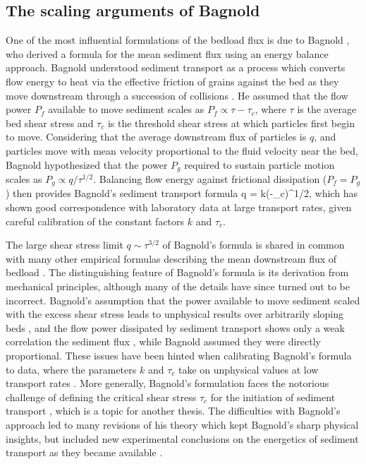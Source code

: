 \subsection{The scaling arguments of Bagnold}

One of the most influential formulations of the bedload flux is due to Bagnold \citep{Bagnold1956,Bagnold1966}, who derived a formula for the mean sediment flux using an energy balance approach.
Bagnold understood sediment transport as a process which converts flow energy to heat via the effective friction \citep{Bagnold1954} of grains against the bed as they move downstream through a succession of collisions \citep{Bagnold1973}.
He assumed that the flow power $P_f$ available to move sediment scales as $P_f \propto \tau - \tau_c$, where $\tau$ is the average bed shear stress and $\tau_c$ is the threshold shear stress at which particles first begin to move. 
Considering that the average downstream flux of particles is $q$, and particles move with mean velocity proportional to the fluid velocity near the bed, Bagnold hypothesized that the power $P_g$ required to sustain particle motion scales as $P_g \propto q/\tau^{1/2}.$
 Balancing flow energy against frictional dissipation ($P_f = P_g$) then provides Bagnold's sediment transport formula
\be q = k(\tau-\tau_c)\tau^{1/2}, \label{eq:bagnold}\ee
which has shown good correspondence with laboratory data at large transport rates, given careful calibration of the constant factors $k$ and $\tau_c$.

The large shear stress limit $q \sim \tau^{3/2}$ of Bagnold's formula is shared in common with many other empirical formulas describing the mean downstream flux of bedload \citep[e.g.][]{MeyerPeter1948, Yalin1972, Wilcock2003, Parker1998}. The distinguishing feature of Bagnold's formula is its derivation from mechanical principles, although many of the details have since turned out to be incorrect. Bagnold's assumption that the power available to move sediment scaled with the excess shear stress leads to unphysical results over arbitrarily sloping beds \citep{Seminara2002}, and the flow power dissipated by sediment transport shows only a weak correlation the sediment flux \citep{Ancey2008}, while Bagnold assumed they were directly proportional. These issues have been hinted when calibrating Bagnold's formula to data, where the parameters $k$ and $\tau_c$ take on unphysical values at low transport rates \citep{Nino1996}.
More generally, Bagnold's formulation faces the notorious challenge of defining the critical shear stress $\tau_c$ for the initiation of sediment transport \citep{Paintal1971,Kirchener1990,Houssais2015,Clark2017,Allen2018}, which is a topic for another thesis. 
The difficulties with Bagnold's approach led to many revisions of his theory which kept Bagnold's sharp physical insights, but included new experimental conclusions on the energetics of sediment transport as they became available \citep{Engelund1976,Luque1976,Nino1998,Martin2000}.

